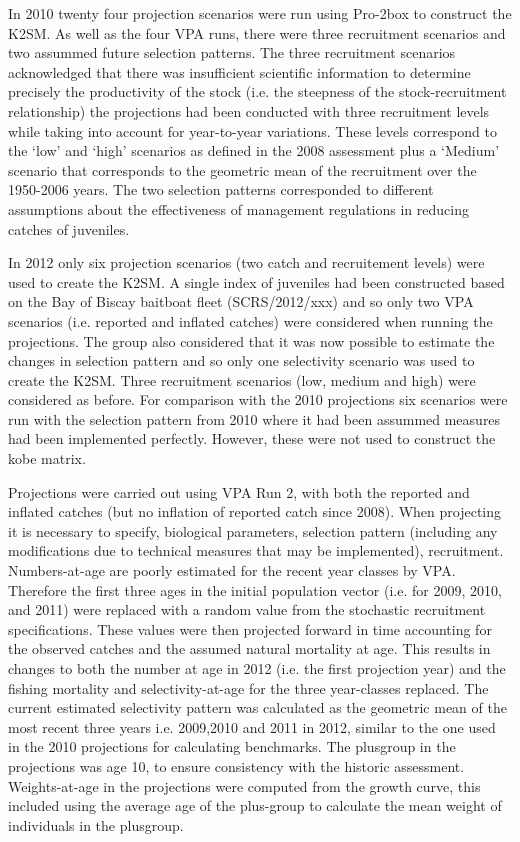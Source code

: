 \documentclass[a4paper, 10pt]{article}
\begin{document}
In 2010 twenty four projection scenarios were run using Pro-2box to construct the K2SM. As  well as the four VPA runs, there were three 
recruitment scenarios and two assummed future selection patterns. The three recruitment scenarios acknowledged that there was insufficient 
scientific information to determine precisely the productivity of the stock (i.e. the steepness of the stock-recruitment relationship) the 
projections had been conducted with three recruitment levels while taking into account for year-to-year variations. These levels correspond 
to the ‘low’ and ‘high’ scenarios as defined in the 2008 assessment plus a ‘Medium’ scenario that corresponds to the geometric mean of the 
recruitment over the 1950-2006 years. The two selection patterns corresponded to different assumptions about the effectiveness of management 
regulations in reducing catches of juveniles.

In 2012 only six projection scenarios (two catch and recruitement levels) were used to create the K2SM. A single index of juveniles had been 
constructed based on the Bay of Biscay baitboat fleet (SCRS/2012/xxx) and so only two VPA scenarios (i.e. reported and inflated catches) were 
considered when running the projections. The group also considered that it was 
now possible to estimate the changes in selection pattern and so only one selectivity scenario was used to create the K2SM. Three
recruitment scenarios (low, medium and high) were considered as before. For comparison with the 2010 projections six scenarios were
run with the selection pattern from 2010 where it had been assummed measures had been implemented perfectly. However, these
were not used to construct the kobe matrix.

Projections were carried out using VPA Run 2, with both the reported and inflated catches (but no inflation of reported catch since 2008). 
When projecting it is necessary to specify, biological parameters, selection pattern (including any modifications due to technical measures 
that may be implemented), recruitment. Numbers-at-age are poorly estimated for the recent year classes by VPA. Therefore 
the first three ages in the initial population vector (i.e. for 2009, 2010, and 2011) were replaced with a random value 
from the stochastic recruitment specifications. These values were then projected forward in time accounting for the observed catches and the 
assumed natural mortality at age. This results in changes to both the number at age in 2012 (i.e. the first projection year) and the fishing 
mortality and selectivity-at-age for the three year-classes replaced. The current estimated selectivity pattern was 
calculated as the geometric mean of the most recent three years i.e.  2009,2010 and 2011 in 2012, 
similar to the one used in the 2010 projections for calculating benchmarks.
The plusgroup in the projections was age 10, to ensure consistency with the historic assessment. Weights-at-age in the 
projections were computed from the growth curve, this included using the average age of the plus-group to calculate the 
mean weight of individuals in the plusgroup.
\end{document}
